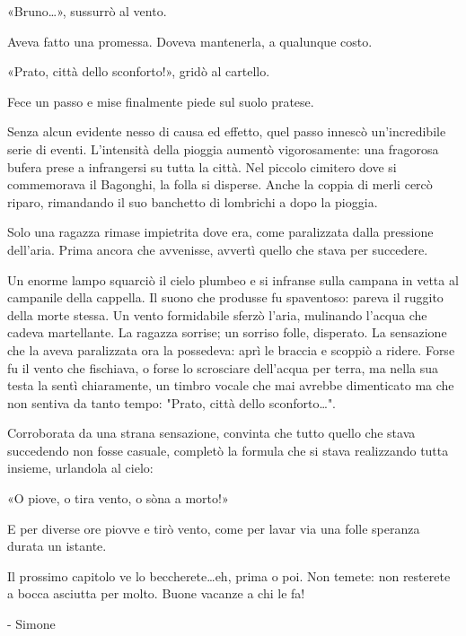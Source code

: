 «Bruno\ldots», sussurrò al vento.

Aveva fatto una promessa. Doveva mantenerla, a qualunque costo.

«Prato, città dello sconforto!», gridò al cartello.

Fece un passo e mise finalmente piede sul suolo pratese.

Senza alcun evidente nesso di causa ed effetto, quel passo innescò un'incredibile serie di eventi. L'intensità della pioggia aumentò vigorosamente: una fragorosa bufera prese a infrangersi su tutta la città. Nel piccolo cimitero dove si commemorava il Bagonghi, la folla si disperse. Anche la coppia di merli cercò riparo, rimandando il suo banchetto di lombrichi a dopo la pioggia. 

Solo una ragazza rimase impietrita dove era, come paralizzata dalla pressione dell'aria. Prima ancora che avvenisse, avvertì quello che stava per succedere.

Un enorme lampo squarciò il cielo plumbeo e si infranse sulla campana in vetta al campanile della cappella. Il suono che produsse fu spaventoso: pareva il ruggito della morte stessa. Un vento formidabile sferzò l'aria, mulinando l'acqua che cadeva martellante. La ragazza sorrise; un sorriso folle, disperato. La sensazione che la aveva paralizzata ora la possedeva: aprì le braccia e scoppiò a ridere. Forse fu il vento che fischiava, o forse lo scrosciare dell'acqua per terra, ma nella sua testa la sentì chiaramente, un timbro vocale che mai avrebbe dimenticato ma che non sentiva da tanto tempo: "Prato, città dello sconforto\ldots".

Corroborata da una strana sensazione, convinta che tutto quello che stava succedendo non fosse casuale, completò la formula che si stava realizzando tutta insieme, urlandola al cielo:

«O piove, o tira vento, o sòna a morto!»

E per diverse ore piovve e tirò vento, come per lavar via una folle speranza durata un istante.


Il prossimo capitolo ve lo beccherete\ldots eh, prima o poi. Non temete: non resterete a bocca asciutta per molto. Buone vacanze a chi le fa!

- Simone



